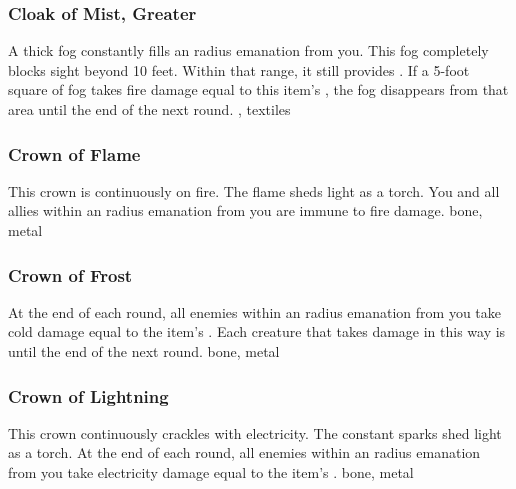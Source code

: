 \lowercase{\hypertarget{item:Cloak of Mist, Greater}{}}\label{item:Cloak of Mist, Greater}
\hypertarget{item:Cloak of Mist, Greater}{\subsubsection{Cloak of Mist, Greater\hfill{}}}
A thick fog constantly fills an \areamed radius emanation from you.
This fog completely blocks sight beyond 10 feet.
Within that range, it still provides \concealment.
If a 5-foot square of fog takes fire damage equal to this item's , the fog disappears from that area until the end of the next round.
 , 
 textiles
\lowercase{\hypertarget{item:Crown of Flame}{}}\label{item:Crown of Flame}
\hypertarget{item:Crown of Flame}{\subsubsection{Crown of Flame\hfill{}}}
This crown is continuously on fire.
The flame sheds light as a torch.
You and all allies within an \arealarge radius emanation from you are immune to fire damage.
 
 bone, metal
\lowercase{\hypertarget{item:Crown of Frost}{}}\label{item:Crown of Frost}
\hypertarget{item:Crown of Frost}{\subsubsection{Crown of Frost\hfill{}}}
At the end of each round, all enemies within an \areamed radius emanation from you take cold damage equal to the item's .
Each creature that takes damage in this way is \fatigued until the end of the next round.
 
 bone, metal
\lowercase{\hypertarget{item:Crown of Lightning}{}}\label{item:Crown of Lightning}
\hypertarget{item:Crown of Lightning}{\subsubsection{Crown of Lightning\hfill{}}}
This crown continuously crackles with electricity.
The constant sparks shed light as a torch.
At the end of each round, all enemies within an \areamed radius emanation from you take electricity damage equal to the item's .
 
 bone, metal
\lowercase{\hypertarget{item:Crown of Thunder}{}}\label{item:Crown of Thunder}

